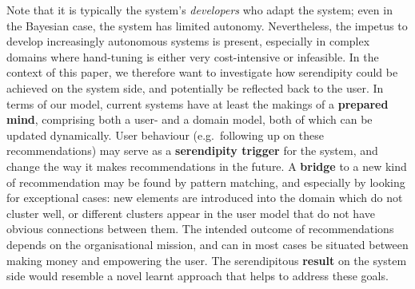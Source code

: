 Note that it is typically the system's \emph{developers} who adapt the system; even in the Bayesian case, the system has limited autonomy. Nevertheless, the impetus to develop increasingly autonomous systems is present, especially in complex domains where hand-tuning is either very cost-intensive or infeasible. In the context of this paper, we therefore want to investigate how serendipity could be achieved on the system side, and potentially be reflected back to the user. In terms of our model, current systems have at least the makings of a \textbf{prepared mind}, comprising both a user- and a domain model, both of which can be updated dynamically. User behaviour (e.g.~following up on these recommendations) may serve as a \textbf{serendipity trigger} for the system, and change the way it makes recommendations in the future. A \textbf{bridge} to a new kind of recommendation may be found by pattern matching, and especially by looking for exceptional cases: new elements are introduced into the domain which do not cluster well, or different clusters appear in the user model that do not have obvious connections between them. The intended outcome of recommendations depends on the organisational mission, and can in most cases be situated between making money and empowering the user. The serendipitous \textbf{result} on the system side would resemble a novel learnt approach that helps to address these goals.

